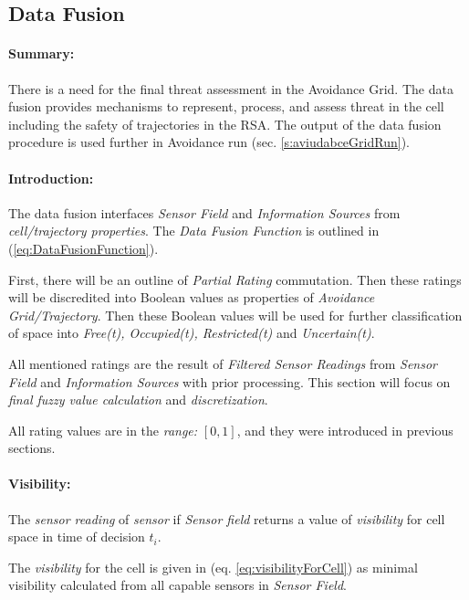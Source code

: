 \subsection{Data Fusion}\label{s:sensorFusion}

\paragraph{Summary:} There is a need for the final threat assessment in the Avoidance Grid. The data fusion provides mechanisms to represent, process, and assess threat in the cell including the safety of trajectories in the RSA. The output of the data fusion procedure is used further in Avoidance run (sec. \ref{s:aviudabceGridRun}).


\paragraph{Introduction:} The data fusion interfaces \emph{Sensor Field} and \emph{Information Sources} from \emph{cell/trajectory properties}. The \emph{Data Fusion Function} is outlined in (\ref{eq:DataFusionFunction}). 

First, there will be an outline of \emph{Partial Rating} commutation. Then these ratings will be discredited into Boolean values as properties of \emph{Avoidance Grid/Trajectory}. Then these Boolean values will be used for further classification of  space into \emph{Free(t), Occupied(t), Restricted(t)} and \emph{Uncertain(t)}.

All mentioned ratings are the result of \emph{Filtered Sensor Readings} from \emph{Sensor Field} and \emph{Information Sources} with prior processing. This section will focus on \emph{final fuzzy value calculation} and \emph{discretization}. 
\begin{note}
    All rating values are in the \emph{range:} $[0,1]$, and they were introduced in previous sections.
\end{note}


\paragraph{Visibility:} The \emph{sensor reading} of \emph{sensor} if \emph{Sensor field} returns a value of \emph{visibility} for cell space in time of decision $t_i$.

The \emph{visibility} for the cell is given in (eq. \ref{eq:visibilityForCell}) as minimal visibility calculated from all capable sensors in \emph{Sensor Field}.

